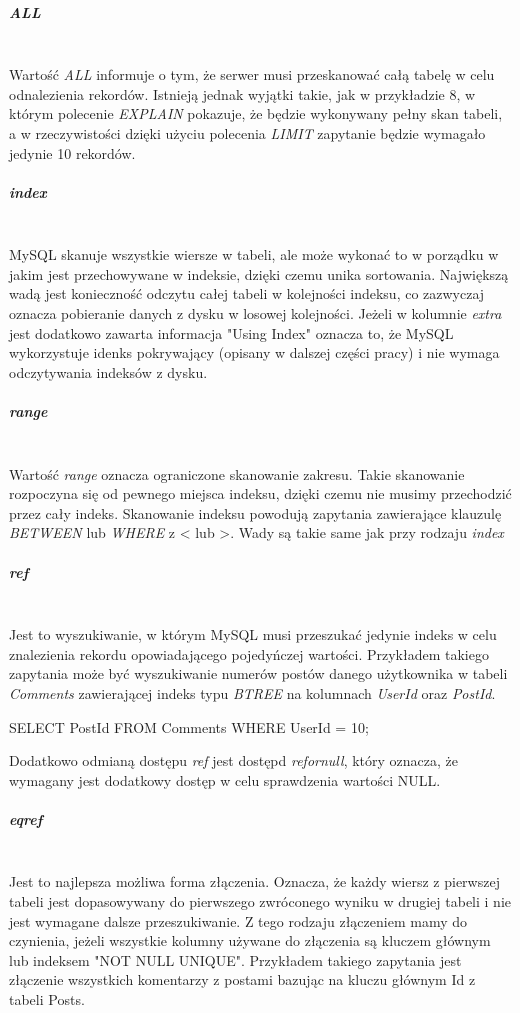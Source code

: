 \subparagraph{ALL}\leavevmode\\
Wartość \textit{ALL} informuje o tym, że serwer musi przeskanować całą tabelę w celu odnalezienia rekordów. Istnieją jednak wyjątki takie, jak w przykładzie 8, w którym polecenie \textit{EXPLAIN} pokazuje, że będzie wykonywany pełny skan tabeli, a w rzeczywistości dzięki użyciu polecenia \textit{LIMIT} zapytanie będzie wymagało jedynie 10 rekordów.

\subparagraph{index}\leavevmode\\
MySQL skanuje wszystkie wiersze w tabeli, ale może wykonać to w porządku w jakim jest przechowywane w indeksie, dzięki czemu unika sortowania. Największą wadą jest konieczność odczytu całej tabeli w kolejności indeksu, co zazwyczaj oznacza pobieranie danych z dysku w losowej kolejności. Jeżeli w kolumnie \textit{extra} jest dodatkowo zawarta informacja "Using Index" oznacza to, że MySQL wykorzystuje idenks pokrywający (opisany w dalszej części pracy) i nie wymaga odczytywania indeksów z dysku.

\subparagraph{range}\leavevmode\\
Wartość \textit{range} oznacza ograniczone skanowanie zakresu. Takie skanowanie rozpoczyna się od pewnego miejsca indeksu, dzięki czemu nie musimy przechodzić przez cały indeks. Skanowanie indeksu powodują zapytania zawierające klauzulę \textit{BETWEEN} lub \textit{WHERE} z < lub >. Wady są takie same jak przy rodzaju \textit{index}

\subparagraph{ref}\leavevmode\\
Jest to wyszukiwanie, w którym MySQL musi przeszukać jedynie indeks w celu znalezienia rekordu opowiadającego pojedyńczej wartości.
Przykładem takiego zapytania może być wyszukiwanie numerów postów danego użytkownika w tabeli \textit{Comments} zawierającej indeks typu \textit{BTREE} na kolumnach \textit{UserId} oraz \textit{PostId}.

\begin{spverbatim}
	SELECT PostId FROM Comments WHERE UserId = 10;
\end{spverbatim}
Dodatkowo odmianą dostępu \textit{ref} jest dostępd \textit{ref\textunderscore or\textunderscore null}, który oznacza, że wymagany jest dodatkowy dostęp w celu sprawdzenia wartości NULL.

\subparagraph{eq\textunderscore ref}\leavevmode\\

Jest to najlepsza możliwa forma złączenia. Oznacza, że każdy wiersz z pierwszej tabeli jest dopasowywany do pierwszego zwróconego wyniku w drugiej tabeli i nie jest wymagane dalsze przeszukiwanie. Z tego rodzaju złączeniem mamy do czynienia, jeżeli wszystkie kolumny używane do złączenia są kluczem głównym lub indeksem "NOT NULL UNIQUE". Przykładem takiego zapytania jest złączenie wszystkich komentarzy z postami bazując na kluczu głównym Id z tabeli Posts. 

